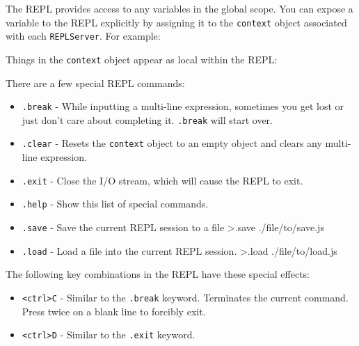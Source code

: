 The REPL provides access to any variables in the global scope. You can
expose a variable to the REPL explicitly by assigning it to the
\texttt{context} object associated with each \texttt{REPLServer}. For
example:

\begin{Shaded}
\begin{Highlighting}[]
 \NormalTok{),}
    \NormalTok{;}

\NormalTok{(} 
\end{Highlighting}
\end{Shaded}

Things in the \texttt{context} object appear as local within the REPL:

\begin{Shaded}
\begin{Highlighting}[]
\end{Highlighting}
\end{Shaded}

There are a few special REPL commands:

\begin{itemize}
\item
  \texttt{.break} - While inputting a multi-line expression, sometimes
  you get lost or just don't care about completing it. \texttt{.break}
  will start over.
\item
  \texttt{.clear} - Resets the \texttt{context} object to an empty
  object and clears any multi-line expression.
\item
  \texttt{.exit} - Close the I/O stream, which will cause the REPL to
  exit.
\item
  \texttt{.help} - Show this list of special commands.
\item
  \texttt{.save} - Save the current REPL session to a file
  \textgreater{}.save ./file/to/save.js
\item
  \texttt{.load} - Load a file into the current REPL session.
  \textgreater{}.load ./file/to/load.js
\end{itemize}

The following key combinations in the REPL have these special effects:

\begin{itemize}
\item
  \texttt{\textless{}ctrl\textgreater{}C} - Similar to the
  \texttt{.break} keyword. Terminates the current command. Press twice
  on a blank line to forcibly exit.
\item
  \texttt{\textless{}ctrl\textgreater{}D} - Similar to the
  \texttt{.exit} keyword.
\end{itemize}
